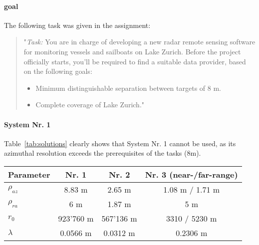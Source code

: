 \documentclass[11pt, a4paper, BCOR12mm, headexclude, footexclude, twoside,%
openright]{scrartcl}
\numberwithin{equation}{section}
\numberwithin{figure}{section}
\numberwithin{table}{section}
\begin{document}
\paragraph{goal}The following task was given in the assignment:
\begin{quotation}"\emph{Task:} You are in charge of developing a new radar remote sensing software for monitoring vessels and sailboats on Lake Zurich. Before the project officially starts, you’ll be required to find a suitable data provider, based on the following goals:

\begin{itemize}
  \item Minimum distinguishable separation between targets of 8 m.
  \item Complete coverage of Lake Zurich."
\end{itemize}
\end{quotation}

\newpage

{%
  \renewcommand{\headrulewidth}{0.5pt}%
  \renewcommand{\footrulewidth}{0.5pt}
  \fancyhf{}%
  \fancyhead[R]{\emph{\footnotesize \today}}
}

\thispagestyle{plain}

\paragraph{System Nr. 1}Table~\ref{tab:solutions} clearly shows that System Nr. 1 cannot be used, as its azimuthal resolution exceeds the prerequisites of the tasks (8m).

\begin{table}[h]
\centering
{}
\begin{tabular}{l c c c}
\toprule[1pt] \textbf{Parameter} & \textbf{Nr. 1} & \textbf{Nr. 2} & \textbf{Nr. 3 (near-/far-range)}\\\midrule[0.5pt]
${\rho}_{az}$ & 8.83 m &2.65 m & 1.08 m / 1.71 m \\
${\rho}_{ra}$ & 6 m & 1.87 m & 5 m\\
${r}_{0}$ & 923'760 m & 567'136 m & 3310 / 5230 m \\
$\lambda$ & 0.0566 m & 0.0312 m & 0.2306 m\\
\bottomrule[1pt]
\end{tabular}
\end{table}
\end{document}
